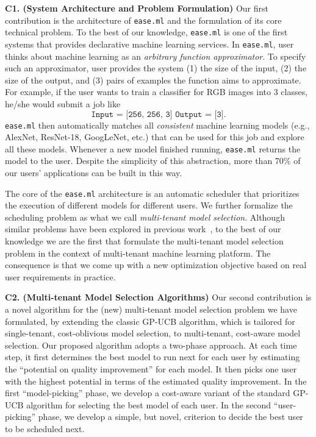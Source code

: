 \documentclass[letterpaper]{vldb}
\newcommand{\eml}{\texttt{ease.ml}\xspace}
\begin{document}
\noindent
{\bf C1. (System Architecture and Problem Formulation)}
Our first contribution is the architecture of \eml and the formulation of its core technical problem.
To the best of our knowledge, \eml is one of the first systems that provides declarative machine learning services.
In \eml, user thinks about machine learning as an {\em arbitrary function approximator}.
To specify such an approximator, user provides the
system (1) the size of the input, (2) the size of the output,
and (3) pairs of examples the function aims to approximate.
For example, if the user wants to train a classifier
for RGB images into 3 classes, he/she would submit a job like
\vspace{-0.5em}
\[
\texttt{Input = [256, 256, 3]
        Output = [3]}.
\]
\eml then automatically matches all {\em consistent} machine
learning models (e.g., AlexNet, ResNet-18, GoogLeNet, etc.) 
that can be used for this job and explore all these models.
Whenever a new model finished running, \eml returns the model to the user.
Despite the simplicity of this abstraction, more than 70\% of
our users' applications can be built in this way.



The core of the \eml architecture is an automatic scheduler that prioritizes the execution of different models for different users.
We further formalize the scheduling problem as what we call {\em multi-tenant model selection}.
Although similar problems have been explored in previous work~\cite{XXX}, to the best of our knowledge we are the first that formulate the multi-tenant model selection problem in the context of multi-tenant machine learning platform.
The consequence is that we come up with a new optimization objective based on real user requirements in practice.


\noindent
{\bf C2. (Multi-tenant Model Selection Algorithms)} Our second contribution
is a novel algorithm for the (new) multi-tenant model selection problem we have formulated, by extending 
the classic GP-UCB algorithm, which is tailored for single-tenant, cost-oblivious model
selection, to multi-tenant, cost-aware model selection.
Our proposed algorithm adopts a two-phase approach.
At each time step, it first determines the 
best model to run next for each user by
estimating the ``potential on quality improvement'' for each model.
It then picks one user with the highest potential in terms of the estimated quality improvement.
In the first ``model-picking'' phase, we develop a cost-aware variant of the 
standard GP-UCB algorithm for selecting the best model of 
each user. In the second ``user-picking'' phase, we develop a simple, but novel, criterion to decide the best user to be scheduled next.
\end{document}
